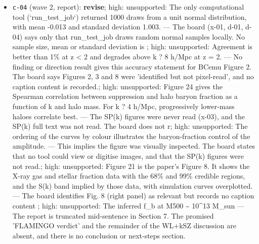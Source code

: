 \documentclass[11pt,a4paper]{article}
\begin{document}
\begin{itemize}
  \item \texttt{c-04} (wave 2, report): \textbf{revise}; high: unsupported: The only computational tool (`run\_test\_job`) returned 1000 draws from a unit normal distribution, with mean -0.013 and standard deviation 1.003. --- The board (x-01, d-01, d-04) says only that run\_test\_job draws random normal samples locally. No sample size, mean or standard deviation is ; high: unsupported: Agreement is better than 1\% at z \textless{} 2 and degrades above k ? 8 h/Mpc at z = 2. --- No finding or direction result gives this accuracy statement for BCemu Figure 2. The board says Figures 2, 3 and 8 were 'identified but not pixel-read', and no caption content is recorded.; high: unsupported: Figure 24 gives the Spearman correlation between suppression and halo baryon fraction as a function of k and halo mass. For k ? 4 h/Mpc, progressively lower-mass haloes correlate best. --- The SP(k) figures were never read (x-03), and the SP(k) full text was not read. The board does not r; high: unsupported: The ordering of the curves by colour illustrates the baryon-fraction control of the amplitude. --- This implies the figure was visually inspected. The board states that no tool could view or digitise images, and that the SP(k) figures were not read.; high: unsupported: Figure 21 is the paper's Figure 8. It shows the X-ray gas and stellar fraction data with the 68\% and 99\% credible regions, and the S(k) band implied by those data, with simulation curves overplotted. --- The board identifies Fig. 8 (right panel) as relevant but records no caption content ; high: unsupported: The inferred f\_b at M500 \textasciitilde{} 10\textasciicircum{}13 M\_sun --- The report is truncated mid-sentence in Section 7. The promised 'FLAMINGO verdict' and the remainder of the WL+kSZ discussion are absent, and there is no conclusion or next-steps section.

\end{itemize}
\end{document}
